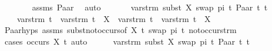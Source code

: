 \begin{isabellebody}
\ \ \ \ \ \ \isamarkupfalse%
\ assms{\isacharparenleft}{\kern0pt}{}{\isacharparenright}{\kern0pt}\ Paar\ \isamarkupfalse%
\ auto\ \isanewline
\ \ \ \ \isamarkupfalse%
\ {\isachardoublequoteopen}vars{\isacharunderscore}{\kern0pt}trm\ {\isacharparenleft}{\kern0pt}subst\ {\isacharbrackleft}{\kern0pt}{\isacharparenleft}{\kern0pt}X{\isacharcomma}{\kern0pt}\ swap\ pi\ t{}{\isacharparenright}{\kern0pt}{\isacharbrackright}{\kern0pt}\ {\isacharparenleft}{\kern0pt}Paar\ t{}{}\ t{}{}{\isacharparenright}{\kern0pt}{\isacharparenright}{\kern0pt}\ {\isacharequal}{\kern0pt}\isanewline
\ \ \ \ {\isacharparenleft}{\kern0pt}vars{\isacharunderscore}{\kern0pt}trm\ t{}\ {\isasymunion}\ vars{\isacharunderscore}{\kern0pt}trm\ t{}{}\ {\isacharminus}{\kern0pt}\ {\isacharbraceleft}{\kern0pt}X{\isacharbraceright}{\kern0pt}{\isacharparenright}{\kern0pt}\ {\isasymunion}\ {\isacharparenleft}{\kern0pt}vars{\isacharunderscore}{\kern0pt}trm\ t{}\ {\isasymunion}\ vars{\isacharunderscore}{\kern0pt}trm\ t{}{}\ {\isacharminus}{\kern0pt}\ {\isacharbraceleft}{\kern0pt}X{\isacharbraceright}{\kern0pt}{\isacharparenright}{\kern0pt}{\isachardoublequoteclose}\isanewline
\ \ \ \ \ \ \isamarkupfalse%
\ Paar{\isachardot}{\kern0pt}hyps{\isacharparenleft}{\kern0pt}{}{\isacharparenright}{\kern0pt}\ assms{\isacharparenleft}{\kern0pt}{}{\isacharparenright}{\kern0pt}\ subst{\isacharunderscore}{\kern0pt}not{\isacharunderscore}{\kern0pt}occurs{\isacharbrackleft}{\kern0pt}of\ X\ t{}{}\ {\isacartoucheopen}swap\ pi\ t{}{\isacartoucheclose}{\isacharbrackright}{\kern0pt}\ not{\isacharunderscore}{\kern0pt}occurs{\isacharunderscore}{\kern0pt}trm\isanewline
\ \ \ \ \ \ \isamarkupfalse%
\ {\isacharparenleft}{\kern0pt}cases\ {\isachardoublequoteopen}occurs\ X\ t{}{}{\isachardoublequoteclose}{\isacharparenright}{\kern0pt}\ auto\isanewline
\ \ \ \ \isamarkupfalse%
\ {\isachardoublequoteopen}vars{\isacharunderscore}{\kern0pt}trm\ {\isacharparenleft}{\kern0pt}subst\ {\isacharbrackleft}{\kern0pt}{\isacharparenleft}{\kern0pt}X{\isacharcomma}{\kern0pt}\ swap\ pi\ t{}{\isacharparenright}{\kern0pt}{\isacharbrackright}{\kern0pt}\ {\isacharparenleft}{\kern0pt}Paar\ t{}{}\ t{}{}{\isacharparenright}{\kern0pt}{\isacharparenright}{\kern0pt}\ {\isacharequal}{\kern0pt}\isanewline

\end{isabellebody}
